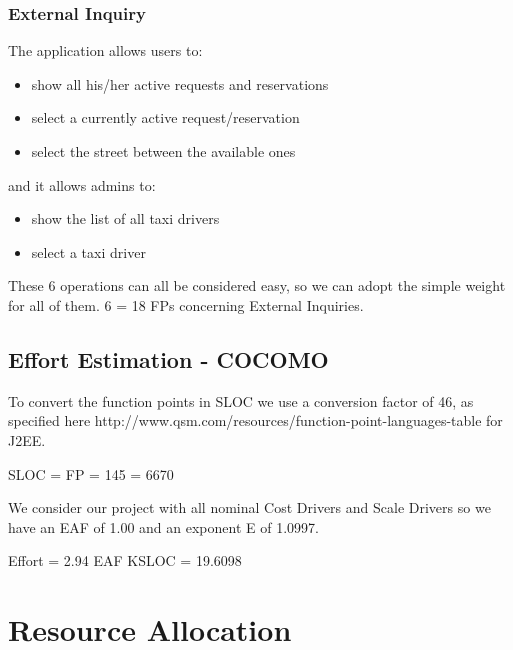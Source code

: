 \documentclass{article}
\begin{document}
\subsubsection{External Inquiry}
The application allows users to:
\begin{itemize}
	\item show all his/her active requests and reservations
	\item select a currently active request/reservation
	\item select the street between the available ones
\end{itemize}
and it allows admins to:
\begin{itemize}
	\item show the list of all taxi drivers
	\item select a taxi driver
\end{itemize}
These 6 operations can all be considered easy, so we can adopt the simple weight for all of them. 6 = 18 FPs concerning External Inquiries.

\subsection{Effort Estimation - COCOMO}
To convert the function points in SLOC we use a 
conversion factor of 46, as specified here 
http://www.qsm.com/resources/function-point-languages-table
for J2EE.
\begin{center}
	SLOC = FP  = 145  = 6670
\end{center}
We consider our project with all nominal Cost Drivers and
Scale Drivers so we have an EAF of 1.00 and an
exponent E of 1.0997.
\begin{center}
	Effort = 2.94 \texttimes EAF  KSLOC = 19.6098
\end{center}
\section{Resource Allocation}
\end{document}
